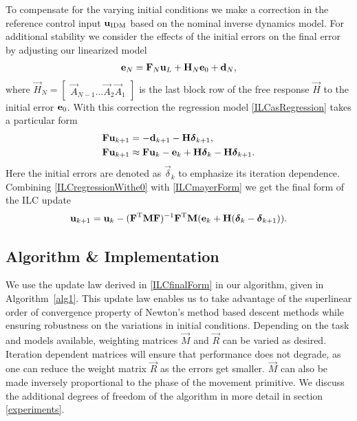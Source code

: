 To compensate for the varying initial conditions we make a correction in the reference control input $\boldsymbol{\mathrm{u}}_{\mathrm{IDM}}$ based on the nominal inverse dynamics model. For additional stability we consider the effects of the initial errors on the final error by adjusting our linearized model
%
\begin{equation}
\begin{aligned}
\boldsymbol{\mathrm{e}}_N &= \boldsymbol{\mathrm{F}}_N\boldsymbol{\mathrm{u}}_L + \boldsymbol{\mathrm{H}}_N\boldsymbol{\mathrm{e}}_0 + \boldsymbol{\mathrm{d}}_N, \\
\end{aligned}
\label{adjustedLiftedLTV}
\end{equation}
%
\noindent where $\vec{H}_N = \begin{bmatrix} \vec{A}_{N-1} \ldots \vec{A}_2 \vec{A}_1 \end{bmatrix}$ is the last block row of the free response $\vec{H}$ to the initial error $\boldsymbol{\mathrm{e}}_0$. With this correction the regression model \eqref{ILCasRegression} takes a particular form
%
\begin{equation}
\begin{aligned}
\boldsymbol{\mathrm{F}}\boldsymbol{\mathrm{u}}_{k+1} &= -\boldsymbol{\mathrm{d}}_{k+1} - \boldsymbol{\mathrm{H}}\boldsymbol{\mathrm{\delta}}_{k+1},\\
\boldsymbol{\mathrm{F}}\boldsymbol{\mathrm{u}}_{k+1} &\approx \boldsymbol{\mathrm{F}}\boldsymbol{\mathrm{u}}_{k} - \boldsymbol{\mathrm{e}}_k + \boldsymbol{\mathrm{H}}\boldsymbol{\mathrm{\delta}}_{k} - \boldsymbol{\mathrm{H}}\boldsymbol{\mathrm{\delta}}_{k+1}.
\end{aligned}
\label{ILCregressionWithe0}
\end{equation}
%
\noindent Here the initial errors are denoted as $\vec{\delta}_k$ to emphasize its iteration dependence. Combining \eqref{ILCregressionWithe0} with \eqref{ILCmayerForm} we get the final form of the ILC update
%
\begin{equation}
\begin{aligned}
\boldsymbol{\mathrm{u}}_{k+1} &= \boldsymbol{\mathrm{u}}_k - (\boldsymbol{\mathrm{F}}^{\mathrm{T}}\boldsymbol{\mathrm{M}}\boldsymbol{\mathrm{F}})^{-1}\boldsymbol{\mathrm{F}}^{\mathrm{T}}\boldsymbol{\mathrm{M}}(\boldsymbol{\mathrm{e}}_k + \boldsymbol{\mathrm{H}}(\boldsymbol{\mathrm{\delta}}_{k} - \boldsymbol{\mathrm{\delta}}_{k+1})).\\
\end{aligned}
\label{ILCfinalForm}
\end{equation}

\subsection{Algorithm \& Implementation}\label{algorithm}

We use the update law derived in \eqref{ILCfinalForm} in our algorithm, given in Algorithm~\ref{alg1}. This update law enables us to take advantage of the superlinear order of convergence property of Newton's method based descent methods while ensuring robustness on the variations in initial conditions. Depending on the task and models available, weighting matrices $\vec{M}$ and $\vec{R}$ can be varied as desired. Iteration dependent matrices will ensure that performance does not degrade, as one can reduce the weight matrix $\vec{R}$ as the errors get smaller. $\vec{M}$ can also be made inversely proportional to the phase of the movement primitive. We discuss the additional degrees of freedom of the algorithm in more detail in section \ref{experiments}.

